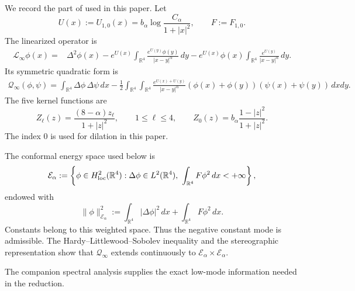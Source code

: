 \documentclass[11pt]{article}
\numberwithin{equation}{section}
\begin{document}
We record the part of \cite{DengSpectrum} used in this paper. Let
\begin{equation*}
U(x):=U_{1,0}(x)
=b_{\alpha}\log\frac{C_{\alpha}}{1+|x|^{2}},
\qquad F:=F_{1,0}.
\end{equation*}
The linearized operator is
\begin{equation*}
\begin{aligned}
\mathcal L_{\infty}\phi(x)
={}&\Delta^{2}\phi(x)
-e^{U(x)}\int_{\mathbb R^{4}}
\frac{e^{U(y)}\phi(y)}{|x-y|^{\alpha}}\,dy-e^{U(x)}\phi(x)
\int_{\mathbb R^{4}}
\frac{e^{U(y)}}{|x-y|^{\alpha}}\,dy.
\end{aligned}
\end{equation*}
Its symmetric quadratic form is
\begin{equation*}
\begin{aligned}
\mathcal Q_\infty(\phi,\psi)
={}\int_{\mathbb R^4}\Delta\phi\,\Delta\psi\,dx-\frac12\int_{\mathbb R^4}\int_{\mathbb R^4}
\frac{e^{U(x)+U(y)}}{|x-y|^\alpha}
(\phi(x)+\phi(y))(\psi(x)+\psi(y))\,dxdy.
\end{aligned}
\end{equation*}
The five kernel functions are
\begin{equation*}
Z_{\ell}(z)=\frac{(8-\alpha)z_{\ell}}{1+|z|^{2}},
\qquad 1\leq\ell\leq4,\qquad
Z_{0}(z)=b_{\alpha}\frac{1-|z|^{2}}{1+|z|^{2}}.
\end{equation*}
The index $0$ is used for dilation in this paper.

The conformal energy space used below is
\begin{equation*}
\mathcal E_\alpha
:=\left\{\phi\in H^2_{\rm loc}(\mathbb R^4):
\Delta\phi\in L^2(\mathbb R^4),\
\int_{\mathbb R^4}F\phi^2\,dx<+\infty\right\},
\end{equation*}
endowed with
\begin{equation*}
\|\phi\|_{\mathcal E_\alpha}^2
:=\int_{\mathbb R^4}|\Delta\phi|^2\,dx
+\int_{\mathbb R^4}F\phi^2\,dx.
\end{equation*}
Constants belong to this weighted space. Thus the negative constant
mode is admissible. The Hardy--Littlewood--Sobolev inequality and the
stereographic representation show that $\mathcal Q_\infty$ extends
continuously to $\mathcal E_\alpha\times\mathcal E_\alpha$.

The companion spectral analysis supplies the exact low-mode information
needed in the reduction.
\end{document}
